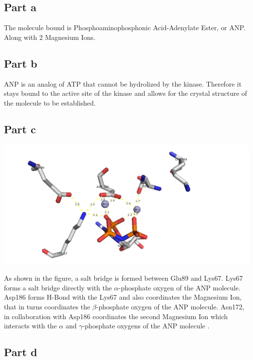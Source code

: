 \documentclass[11pt, a4paper,titlepage]{article}
\begin{document}
\subsection*{Part a}

The molecule bound is Phosphoaminophosphonic Acid-Adenylate Ester, or
ANP. Along with 2 Magnesium Ions.

\subsection*{Part b}

ANP is an analog of ATP that cannot be hydrolized by the
kinase. Therefore it stays bound to the active site of the kinase and
allows for the crystal structure of the molecule to be established.

\subsection*{Part c}

\includegraphics[width=15cm]{./Figures/4c.png}

As shown in the figure, a salt bridge is formed between Glu89 and
Lys67.  Lys67 forms a salt bridge directly with the $\alpha$-phosphate
oxygen of the ANP molecule. Asp186 forms H-Bond with the Lys67 and
also coordinates the Magnesium Ion, that in turns coordinates the
$\beta$-phosphate oxygen of the ANP molecule. Asn172, in collaboration
with Asp186 coordinates the second Magnesium Ion which interacts with
the $\alpha$ and $\gamma$-phosphate oxygens of the ANP molecule
\cite{CSPim1Kinase}.

\subsection*{Part d}
\end{document}
